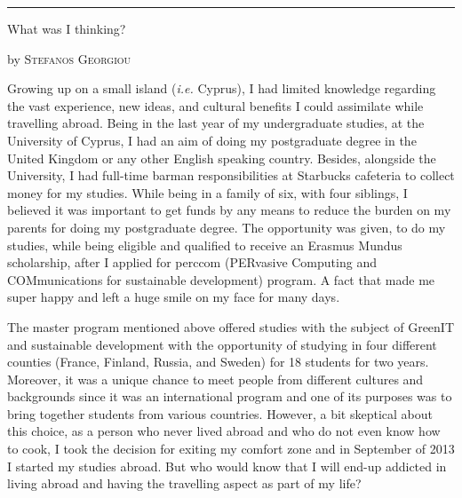 \documentclass[10pt,a4paper]{article} %
\newcommand{\SepRule}{\noindent	%
\begin{center}
\rule{250pt}{1pt} %
\end{center}
}
\newcommand{\NewsItem}[1]{ %
\usefont{T1}{fvs}{n}{n} %
\vspace{24pt}\large #1\vspace{3pt} %
\par \normalsize \normalfont}
\newcommand{\NewsAuthor}[1]{ %
\hfill by \textsc{#1} \vspace{20pt} %
\par \normalfont}
\begin{document}
\vspace{0.5cm}
\SepRule %
\vspace{0.5cm}

\begin{multicols}{3} %


\NewsItem{What was I thinking?}
\NewsAuthor{Stefanos Georgiou}

Growing up on a small island (\textit{i.e.} Cyprus), I had limited knowledge regarding 
the vast experience, new ideas, and cultural benefits I could assimilate while 
travelling abroad. 
Being in the last year of my undergraduate studies, at the University of Cyprus, 
I had an aim of doing my postgraduate degree in the United Kingdom or any other 
English speaking country. 
Besides, alongside the University, I had full-time barman responsibilities 
at Starbucks cafeteria to collect money for my studies. 
While being in a family of six, with four siblings, I believed it was important 
to get funds by any means to reduce the burden on my parents for doing my postgraduate
degree. 
The opportunity was given, to do my studies, while being eligible and qualified to 
receive an Erasmus Mundus scholarship, after I applied for {\sc perccom} (PERvasive 
Computing and COMmunications for sustainable development) program. 
A fact that made me super happy and left a huge smile on my face for many days.

The master program mentioned above offered studies with the subject of GreenIT and 
sustainable development with the opportunity of studying in four different counties 
(France, Finland, Russia, and Sweden) for 18 students for two years. 
Moreover, it was a unique chance to meet people from different cultures and backgrounds 
since it was an international program and one of its purposes was to bring together 
students from various countries. 
However, a bit skeptical about this choice, as a person who never lived abroad and 
who do not even know how to cook, I took the decision for exiting my comfort zone 
and in September of 2013 I started my studies abroad. 
But who would know that I will end-up addicted in living abroad and having the 
travelling aspect as part of my life?


\end{multicols}
\end{document}
